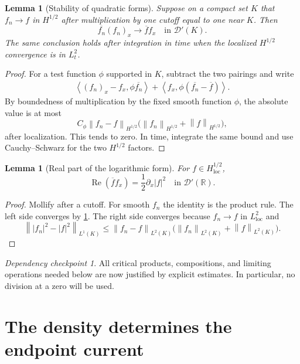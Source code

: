 \documentclass[11pt,oneside]{book}
\newtheorem{lemma}[theorem]{Lemma}
\theoremstyle{definition}
\theoremstyle{remark}
\newtheorem{checkpoint}[theorem]{Dependency checkpoint}
\newcommand{\R}{\mathbb R}
\newcommand{\D}{\mathcal D}
\newcommand{\1}{\mathbf 1}
\newcommand{\loc}{\mathrm{loc}}
\newcommand{\Rea}{\operatorname{Re}}
\newcommand{\norm}[1]{\left\lVert #1\right\rVert}
\newcommand{\pair}[2]{\left\langle #1,#2\right\rangle}
\begin{document}
\begin{lemma}[Stability of quadratic forms]\label{lem:quad-stability}
Suppose on a compact set $K$ that
$f_n\to f$ in $H^{1/2}$ after multiplication by one cutoff equal to one near
$K$.  Then
\[
 \overline{f_n}(f_n)_x\longrightarrow\overline f f_x
 \quad\text{in }\D'(K).
\]
The same conclusion holds after integration in time when the localized
$H^{1/2}$ convergence is in $L^2_t$.
\end{lemma}

\begin{proof}
For a test function $\phi$ supported in $K$, subtract the two pairings and
write
\begin{align*}
 \pair{(f_n)_x-f_x}{\phi\overline{f_n}}
 +\pair{f_x}{\phi(\overline{f_n}-\overline f)}.
\end{align*}
By boundedness of multiplication by the fixed smooth function $\phi$, the
absolute value is at most
\[
 C_\phi\norm{f_n-f}_{H^{1/2}}
 \bigl(\norm{f_n}_{H^{1/2}}+\norm f_{H^{1/2}}\bigr),
\]
after localization.  This tends to zero.  In time, integrate the same bound
and use Cauchy--Schwarz for the two $H^{1/2}$ factors.
\end{proof}

\begin{lemma}[Real part of the logarithmic form]\label{lem:real-log-form}
For $f\in H^{1/2}_{\loc}$,
\begin{equation}
  \Rea(\overline f f_x)=\frac12\partial_x|f|^2
  \quad\text{in }\D'(\R).                         \label{eq:real-log-form}
\end{equation}
\end{lemma}

\begin{proof}
Mollify after a cutoff.  For smooth $f_n$ the identity is the product rule.
The left side converges by \cref{lem:quad-stability}.  The right side
converges because $f_n\to f$ in $L^2_{\loc}$ and
\[
 \norm{|f_n|^2-|f|^2}_{L^1(K)}
 \le \norm{f_n-f}_{L^2(K)}
     \bigl(\norm{f_n}_{L^2(K)}+\norm f_{L^2(K)}\bigr).
\]
\end{proof}

\begin{checkpoint}
All critical products, compositions, and limiting operations needed below are
now justified by explicit estimates.  In particular, no division at a zero
will be used.
\end{checkpoint}

\chapter{The density determines the endpoint current}\label{chap:current}
\end{document}
